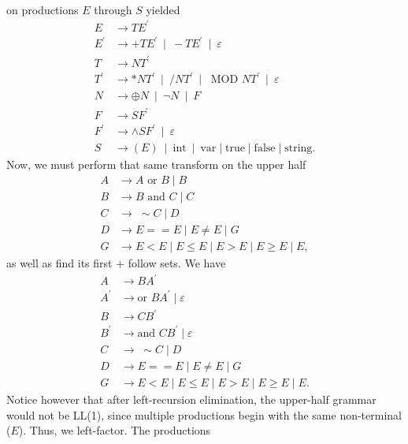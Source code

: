 \documentclass{report}
\begin{document}
\begin{itemize}
\begin{align*}
        \end{align*}
        on productions $E$ through $S$ yielded
        \begin{align*}
            E &\to TE^{\prime} \\
            E^{\prime} &\to +TE^{\prime} \ \mid \ -TE^{\prime} \ \mid \ \varepsilon \\
            T &\to NT^{\prime} \\
            T^{\prime} &\to *NT^{\prime} \ \mid \ /NT^{\prime} \ \mid \ \text{ MOD } NT^{\prime} \ \mid \ \varepsilon \\
            N &\to \oplus N \ \mid \ \neg N \ \mid \ F \\
            F &\to SF^{\prime} \\
            F^{\prime} &\to \land SF^{\prime} \ \mid \ \varepsilon\\
            S &\to (E) \ \mid \ \text{int} \ \mid \ \text{var} \mid \text{true} \mid \text{false} \mid \text{string}
        .\end{align*}
        Now, we must perform that same transform on the upper half
        \begin{align*}
            A &\to A \text{ or } B \mid B\\
            B &\to B \text{ and } C \mid C\\
            C &\to\; \sim C \mid D \\
            D &\to E == E \mid E \ne E \mid G\\
            G &\to E < E \mid E \leq E \mid E > E \mid E \geq E \mid E 
        ,\end{align*}
        as well as find its first + follow sets. We have 
        \begin{align*}
            A &\to BA^{\prime} \\
            A^{\prime} &\to \text{or } BA^{\prime} \mid \varepsilon \\
            B &\to CB^{\prime} \\
            B^{\prime} &\to \text{and }CB^{\prime} \mid \varepsilon \\
            C &\to\; \sim C \mid D\\
            D &\to E == E \mid E \ne E \mid G \\
            G &\to E < E \mid E \leq E \mid E > E \mid E \geq E \mid E
        .\end{align*}
        Notice however that after left-recursion elimination, the upper-half grammar would not be LL(1), since multiple productions begin with the same non-terminal ($E$). Thus, we left-factor. The productions

\end{itemize}
\end{document}
